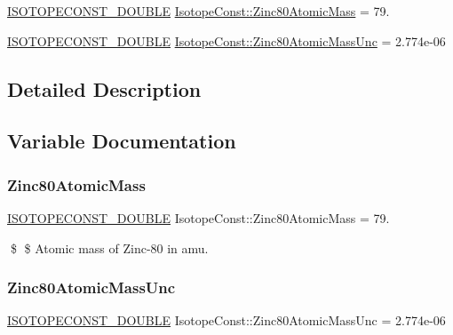 \begin{DoxyCompactItemize}
\item 
\mbox{\hyperlink{group___isotope_const-_macros_ga8f45a7272ce02c0b4c65c44636ed719a}{I\+S\+O\+T\+O\+P\+E\+C\+O\+N\+S\+T\+\_\+\+D\+O\+U\+B\+LE}} \mbox{\hyperlink{group___isotope_const-_zinc-_zn80_ga0cdf61f0917240955d2411ce4c1e6a14}{Isotope\+Const\+::\+Zinc80\+Atomic\+Mass}} = 79.
\item 
\mbox{\hyperlink{group___isotope_const-_macros_ga8f45a7272ce02c0b4c65c44636ed719a}{I\+S\+O\+T\+O\+P\+E\+C\+O\+N\+S\+T\+\_\+\+D\+O\+U\+B\+LE}} \mbox{\hyperlink{group___isotope_const-_zinc-_zn80_gae21de3c6e5a4700b6273ec751da345b9}{Isotope\+Const\+::\+Zinc80\+Atomic\+Mass\+Unc}} = 2.\+774e-\/06
\end{DoxyCompactItemize}


\subsection{Detailed Description}


\subsection{Variable Documentation}
\mbox{\label{group___isotope_const-_zinc-_zn80_ga0cdf61f0917240955d2411ce4c1e6a14}} 
\subsubsection{\texorpdfstring{Zinc80\+Atomic\+Mass}{Zinc80AtomicMass}}
{\footnotesize\ttfamily \mbox{\hyperlink{group___isotope_const-_macros_ga8f45a7272ce02c0b4c65c44636ed719a}{I\+S\+O\+T\+O\+P\+E\+C\+O\+N\+S\+T\+\_\+\+D\+O\+U\+B\+LE}} Isotope\+Const\+::\+Zinc80\+Atomic\+Mass = 79.}

\$ \$ Atomic mass of Zinc-\/80 in amu. \mbox{\label{group___isotope_const-_zinc-_zn80_gae21de3c6e5a4700b6273ec751da345b9}} 
\subsubsection{\texorpdfstring{Zinc80\+Atomic\+Mass\+Unc}{Zinc80AtomicMassUnc}}
{\footnotesize\ttfamily \mbox{\hyperlink{group___isotope_const-_macros_ga8f45a7272ce02c0b4c65c44636ed719a}{I\+S\+O\+T\+O\+P\+E\+C\+O\+N\+S\+T\+\_\+\+D\+O\+U\+B\+LE}} Isotope\+Const\+::\+Zinc80\+Atomic\+Mass\+Unc = 2.\+774e-\/06}

